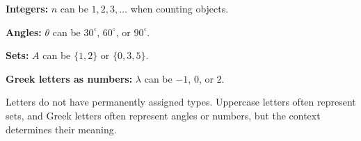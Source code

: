 \documentclass{article}
\begin{document}
\begin{minipage}[t]{.49\linewidth}
{\vspace{0.7mm}
\textbf{Integers:} $n$ can be $1,2,3,\ldots$ when counting objects.\par
\vspace{0.7mm}
\textbf{Angles:} $\theta$ can be $30^\circ$, $60^\circ$, or $90^\circ$.\par
\vspace{0.7mm}
\textbf{Sets:} $A$ can be $\{1,2\}$ or $\{0,3,5\}$.\par
\vspace{0.7mm}
\textbf{Greek letters as numbers:} $\lambda$ can be $-1$, $0$, or $2$.\par
\vspace{1.3mm}
Letters do not have permanently assigned types. Uppercase
letters often represent sets, and Greek letters often represent
angles or numbers, but the context determines their meaning.\par
}


\end{minipage}\hfill
\end{document}
